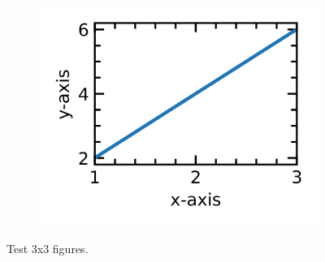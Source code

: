\documentclass[12pt,a4paper,twoside]{article}
\numberwithin{equation}{section}
\renewcommand{\_}{\textscale{.7}{\textunderscore}}
\begin{document}
\begin{figure}[H]
    \begin{subfigure}{0.325\linewidth}
		\includegraphics[width=1.0\linewidth]{3x3.png}
	\end{subfigure}
    \caption{Test 3x3 figures.}
\end{figure} 
\end{document}
